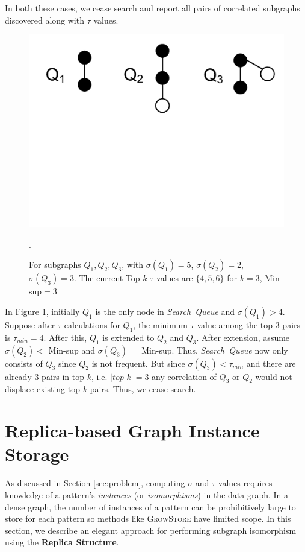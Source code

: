 In both these cases, we cease search and report all pairs of correlated
subgraphs discovered along with $\tau$ values. 

\begin{figure}[t!]
	\centering
	\includegraphics[scale=0.32]{images/ceasing_condition}
	\vspace{-2mm}
	\caption{\scriptsize For subgraphs $Q_1,Q_2,Q_3$, with $\sigma(Q_1)=5$,
	$\sigma(Q_2)=2$, $\sigma(Q_3)=3$. The current {\sf Top-$k$} $\tau$ values
	are $\{4,5,6\}$ for $k=3$, {\sf Min-sup}$=3$}.
	\label{fig:ceasing_condition}
	\vspace{-6mm}
\end{figure}
\begin{exple}
	In Figure \ref{fig:ceasing_condition}, initially $Q_1$ is the
	only node in \emph{Search\ Queue} and $\sigma(Q_1)>4$. Suppose after
	$\tau$ calculations for $Q_1$, the minimum
	$\tau$ value among the {\sf top-$3$} pairs is $\tau{_{min}}=4$. After this,
	$Q_1$ is extended to $Q_2$ and $Q_3$. After extension, assume $\sigma(Q_2)<${\sf
	Min-sup} and $\sigma(Q_3)=$ {\sf Min-sup}. Thus, \emph{Search\ Queue} now only
	consists of $Q_3$ since $Q_2$ is not frequent. 
	But since $\sigma(Q_3)<\tau{_{min}}$ and there are already $3$ pairs in {\sf top-$k$}, i.e.
	$|top\_k|=3$ any correlation of $Q_3$ or $Q_2$ would not displace existing
	{\sf top-$k$} pairs. Thus, we cease search.
\end{exple}



\section{Replica-based Graph Instance Storage}
\label{subsec:replica-storage}
As discussed in Section \ref{sec:problem}, computing $\sigma$ and $\tau$
values requires knowledge of a pattern's \emph
{instances} (or \emph{isomorphisms}) in the
data graph. In a dense graph, the number of instances of a pattern can be
prohibitively large to store for each pattern so methods like \textsc{GrowStore} have limited
scope. In this section, we describe an elegant approach for performing subgraph
isomorphism using the \textbf{Replica Structure}.
 
